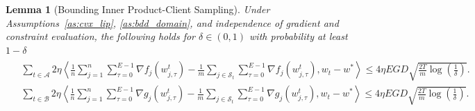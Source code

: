 \documentclass{article} %
\newtheorem{lemma}[]{Lemma}
\def\A{{\mathcal A}}
\def\B{{\mathcal B}}
\def\S{{\mathcal S}}
\newcommand{\inner}[2]{\left\langle #1, #2 \right\rangle}
\begin{document}
\begin{lemma}[Bounding Inner Product-Client Sampling]
    \label{lem:inner_product_bound}
    Under Assumptions~\ref{as:cvx_lip}, \ref{as:bdd_domain}, and independence of gradient and constraint evaluation, the following holds for $\delta \in (0,1)$ with probability at least $1-\delta$
    \begin{align*}
    \begin{aligned}
         &\sum_{t \in \A} 2\eta\inner{\frac{1}{n}\sum_{j=1}^{n}\sum_{\tau=0}^{E-1}\nabla f_j(w_{j,\tau}^t) - \frac{1}{m}\sum_{j\in \S_t}\sum_{\tau=0}^{E-1}\nabla f_j(w_{j,\tau}^t)}{w_t-w^*} \leq 4\eta EGD\sqrt{\frac{2T}{m}\log(\frac{1}{\delta})}.
         \\
         &\sum_{t \in \B} 2\eta\inner{\frac{1}{n}\sum_{j=1}^{n}\sum_{\tau=0}^{E-1}\nabla g_j(w_{j,\tau}^t) - \frac{1}{m}\sum_{j\in \S_t}\sum_{\tau=0}^{E-1}\nabla g_j(w_{j,\tau}^t)}{w_t-w^*} \leq 4\eta EGD\sqrt{\frac{2T}{m}\log(\frac{1}{\delta})}.
    \end{aligned}
    \end{align*}
    
\end{lemma}
\end{document}
